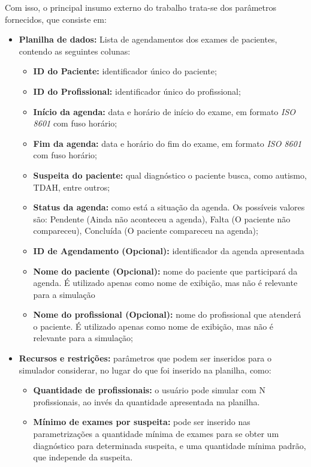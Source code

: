 \documentclass[
    12pt,
    openright,
    oneside,
    a4paper,
    english,
    brazil
]{abntex2}
\begin{document}
Com isso, o principal insumo externo do trabalho trata-se dos parâmetros fornecidos, que consiste em:
\begin{itemize}
	\item \textbf{Planilha de dados:} Lista de agendamentos dos exames de pacientes, contendo as seguintes colunas:
	\begin{itemize}
		\item \textbf{ID do Paciente:} identificador único do paciente;
		\item \textbf{ID do Profissional:} identificador único do profissional;
		\item \textbf{Início da agenda:} data e horário de início do exame, em formato \textit{ISO 8601} com fuso horário;
		\item \textbf{Fim da agenda:} data e horário do fim do exame, em formato \textit{ISO 8601} com fuso horário;
		\item \textbf{Suspeita do paciente:} qual diagnóstico o paciente busca, como autismo, TDAH, entre outros;
		\item \textbf{Status da agenda:} como está a situação da agenda. Os possíveis valores são: Pendente (Ainda não aconteceu a agenda), Falta (O paciente não compareceu), Concluída (O paciente compareceu na agenda);
		\item \textbf{ID de Agendamento (Opcional):} identificador da agenda apresentada
		\item \textbf{Nome do paciente (Opcional):} nome do paciente que participará da agenda. É utilizado apenas como nome de exibição, mas não é relevante para a simulação
		\item \textbf{Nome do profissional (Opcional):} nome do profissional que atenderá o paciente. É utilizado apenas como nome de exibição, mas não é relevante para a simulação;
	\end{itemize}	
	\item \textbf{Recursos e restrições:} parâmetros que podem ser inseridos para o simulador considerar, no lugar do que foi inserido na planilha, como:
	\begin{itemize}
		\item \textbf{Quantidade de profissionais:} o usuário pode simular com N profissionais, ao invés da quantidade apresentada na planilha.
		\item \textbf{Mínimo de exames por suspeita:} pode ser inserido nas parametrizações a quantidade mínima de exames para se obter um diagnóstico para determinada suspeita, e uma quantidade mínima padrão, que independe da suspeita.
	\end{itemize}
\end{itemize}
\end{document}
